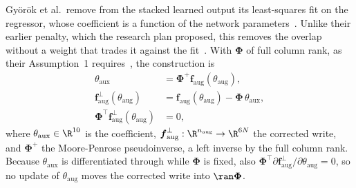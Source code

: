 Gy\"or\"ok et al.\ remove from the stacked learned output its least-squares fit
on the regressor, whose coefficient is a function of the network
parameters~\cite[Eqs.~(8), (10), (11)]{gyorok2026obc}.
Unlike their earlier penalty, which the research plan proposed, this removes
the overlap without a weight that trades it against the
fit~\cite[Remark~1]{gyorok2025l4dc}.
With $\boldsymbol\Phi$ of full column rank, as their Assumption~1
requires~\cite[Eq.~(7)]{gyorok2026obc}, the construction is
\begin{equation}
\begin{aligned}
 \theta_{\mathrm{aux}}&=\boldsymbol\Phi^{+}\boldsymbol f_{\mathrm{aug}}(\theta_{\mathrm{aug}}),\\
 \boldsymbol f^{\perp}_{\mathrm{aug}}(\theta_{\mathrm{aug}})
 &=\boldsymbol f_{\mathrm{aug}}(\theta_{\mathrm{aug}})-\boldsymbol\Phi\,\theta_{\mathrm{aux}},\\
 \boldsymbol\Phi^\top\boldsymbol f^{\perp}_{\mathrm{aug}}(\theta_{\mathrm{aug}})&=0,
\end{aligned}
\label{eq:obc_ours}
\end{equation}
where $\theta_{\mathrm{aux}}\in\R^{10}$ is the coefficient,
$\boldsymbol f^{\perp}_{\mathrm{aug}}:\R^{n_{\mathrm{aug}}}\to\R^{6N}$ the
corrected write, and $\boldsymbol\Phi^{+}$ the Moore-Penrose pseudoinverse, a
left inverse by the full column rank.
Because $\theta_{\mathrm{aux}}$ is differentiated through while
$\boldsymbol\Phi$ is fixed, also
$\boldsymbol\Phi^\top\partial\boldsymbol f^{\perp}_{\mathrm{aug}}/\partial\theta_{\mathrm{aug}}=0$,
so no update of $\theta_{\mathrm{aug}}$ moves the corrected write into
$\ran\boldsymbol\Phi$.

